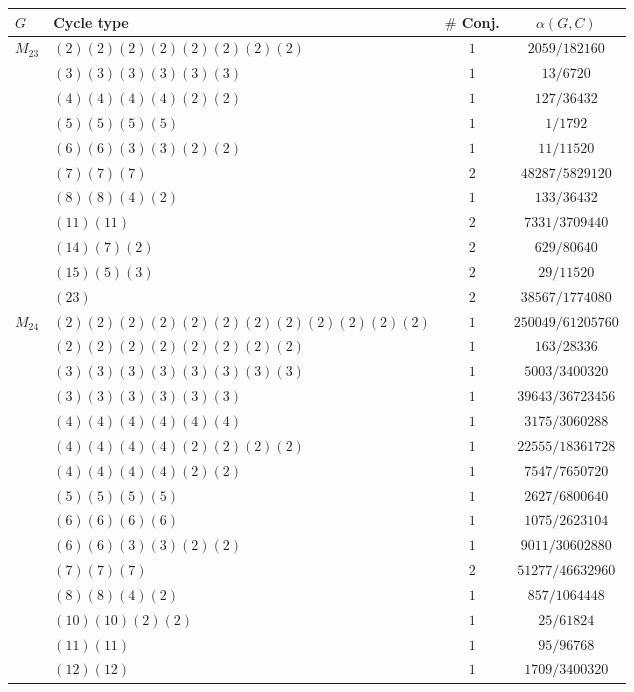 \documentclass[12pt]{amsart}
\theoremstyle{definition} \newtheorem{definition}[theorem]{Definition}
\theoremstyle{example} \newtheorem{example}[theorem]{Example}
\theoremstyle{remark} \newtheorem{remark}{Remark}[theorem]
\numberwithin{equation}{section}
\numberwithin{theorem}{section}
\begin{document}
{\begin{table}[h]
\begin{minipage}[t]{0.49\textwidth}
		\end{minipage}
		\begin{minipage}[t]{0.49\textwidth}
		\begin{tabular}{|l|l|c|c|} \hline
			$G$ & Cycle type & $\#$ Conj. & $\alpha(G,C)$ \\ \hline
			$M_{23}$ 
				& $(2)(2)(2)(2)(2)(2)(2)(2)$ & $1$ & $2059/182160$ \\
				& $(3)(3)(3)(3)(3)(3)$ & $1$ & $13/6720$ \\
				& $(4)(4)(4)(4)(2)(2)$ & $1$ & $127/36432$ \\
				& $(5)(5)(5)(5)$& $1$ & $1/1792$ \\
				& $(6)(6)(3)(3)(2)(2)$ & $1$ & $11/11520$ \\
				& $(7)(7)(7)$ & $2$ & $48287/5829120$ \\
				& $(8)(8)(4)(2)$ & $1$ & $133/36432$ \\
				& $(11)(11)$ & $2$ & $7331/3709440$ \\
				& $(14)(7)(2)$ & $2$ & $629/80640$ \\
				& $(15)(5)(3)$ & $2$ & $29/11520$ \\
				& $(23)$ & $2$ & $38567/1774080$ \\ \hline
			$M_{24}$
				& $(2)(2)(2)(2)(2)(2)(2)(2)(2)(2)(2)(2)$ & $1$ & $250049/61205760$ \\
				& $(2)(2)(2)(2)(2)(2)(2)(2)$ & $1$ & $163/28336$ \\
				& $(3)(3)(3)(3)(3)(3)(3)(3)$ & $1$ & $5003/3400320$ \\
				& $(3)(3)(3)(3)(3)(3)$ & $1$ & $39643/36723456$ \\
				& $(4)(4)(4)(4)(4)(4)$ & $1$ & $ 3175/3060288$ \\
				& $(4)(4)(4)(4)(2)(2)(2)(2)$ & $1$ & $ 22555/18361728$ \\
				& $(4)(4)(4)(4)(2)(2)$ & $1$ & $ 7547/7650720$ \\
				& $(5)(5)(5)(5)$ & $1$ & $2627/6800640$ \\
				& $(6)(6)(6)(6)$ & $1$ & $1075/2623104$ \\
				& $(6)(6)(3)(3)(2)(2)$ & $1$ & $9011/30602880$ \\
				& $(7)(7)(7)$ & $2$ & $51277/46632960$ \\
				& $(8)(8)(4)(2)$ & $1$ & $857/1064448$ \\
				& $(10)(10)(2)(2)$ & $1$ & $25/61824$ \\
				& $(11)(11)$ & $1$ & $95/96768$ \\
				& $(12)(12)$ & $1$ & $1709/3400320$ \\

\end{tabular}
\end{minipage}
\end{table}}
\end{document}
